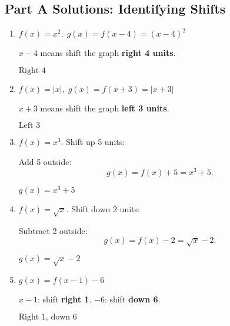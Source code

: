 \documentclass[12pt]{article}
\begin{document}
\subsection*{Part A Solutions: Identifying Shifts}
\begin{enumerate}
  \item \(f(x) = x^2,\; g(x) = f(x - 4) = (x - 4)^2\)

  \(x - 4\) means shift the graph \textbf{right 4 units}.

  \(\boxed{\text{Right 4}}\)

  \item \(f(x) = |x|,\; g(x) = f(x + 3) = |x + 3|\)

  \(x + 3\) means shift the graph \textbf{left 3 units}.

  \(\boxed{\text{Left 3}}\)

  \item \(f(x) = x^3\). Shift up 5 units:

  Add 5 outside:
  \[
  g(x) = f(x) + 5 = x^3 + 5.
  \]

  \(\boxed{g(x) = x^3 + 5}\)

  \item \(f(x) = \sqrt{x}\). Shift down 2 units:

  Subtract 2 outside:
  \[
  g(x) = f(x) - 2 = \sqrt{x} - 2.
  \]

  \(\boxed{g(x) = \sqrt{x} - 2}\)

  \item \(g(x) = f(x - 1) - 6\)

  \(x - 1\): shift \textbf{right 1}.  
  \(-6\): shift \textbf{down 6}.

  \(\boxed{\text{Right 1, down 6}}\)
\end{enumerate}
\end{document}
